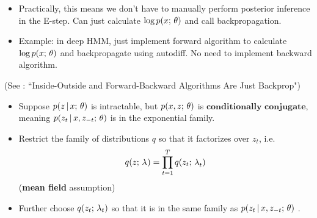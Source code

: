 \begin{frame}
\begin{itemize}
    \item Practically, this means we don't have to manually perform posterior inference in the E-step. Can just calculate $\log p(x ; \, \theta)$ and call backpropagation.
    \item Example: in deep HMM, just implement forward  algorithm to calculate $\log p(x ; \, \theta)$ and backpropagate using autodiff. No need to implement backward algorithm. 
\end{itemize}
    \vspace{2mm}
    (See \cite{eisner2016}:  ``Inside-Outside and Forward-Backward Algorithms Are Just Backprop")
\end{frame}

\begin{frame}

\begin{itemize}
    \item Suppose $p(z \,|\, x ; \, \theta)$ is intractable, but $p(x, z ; \, \theta)$
is $\textbf{conditionally conjugate}$, meaning $p(z_t \,|\, x, z_{-t} ; \, \theta)$ is in the exponential family.
    \item Restrict the family of distributions $q$ so that it factorizes over $z_t$, i.e.\[ q(z ; \, \lambda^{}) = \prod_{t=1}^T q(z_t ; \, \lambda_{t}^{})\] (\textbf{mean field} assumption)
    \item Further choose $q(z_t ; \, \lambda_{t}) $ so that it is
    in the same family as 
$p(z_t \,|\, x, z_{-t} ; \, \theta)$ .

\end{itemize}

\end{frame}

